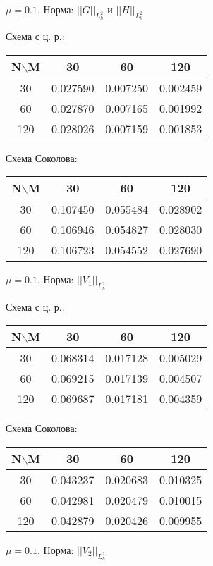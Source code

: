 \documentclass[specialist,subf,href,colorlinks=true,14pt,times,mtpro]{disser}
\begin{document}
$\mu = 0.1.$ Норма:  $||G||_{L^2_h}$ и $||H||_{L^2_h}$

Схема с ц. р.:

\begin{tabular}{|c|c|c|c|}
    \hline
    N$\backslash$M & 30 & 60 & 120 \\
    \hline
    30 & 0.027590 & 0.007250 & 0.002459 \\
    \hline
    60 & 0.027870 & 0.007165 & 0.001992 \\
    \hline
    120 & 0.028026 & 0.007159 & 0.001853 \\
    \hline
\end{tabular}
\BlankLine
Схема Соколова:

\begin{tabular}{|c|c|c|c|}
    \hline
    N$\backslash$M & 30 & 60 & 120 \\
    \hline
    30 & 0.107450 & 0.055484 & 0.028902 \\
    \hline
    60 & 0.106946 & 0.054827 & 0.028030 \\
    \hline
    120 & 0.106723 & 0.054552 & 0.027690 \\
    \hline
\end{tabular}
\BlankLine
\BlankLine
\BlankLine
$\mu = 0.1.$ Норма:  $||V_1||_{L^2_h}$

Схема с ц. р.:

\begin{tabular}{|c|c|c|c|}
    \hline
    N$\backslash$M & 30 & 60 & 120 \\
    \hline
    30 & 0.068314 & 0.017128 & 0.005029 \\
    \hline
    60 & 0.069215 & 0.017139 & 0.004507 \\
    \hline
    120 & 0.069687 & 0.017181 & 0.004359 \\
    \hline
\end{tabular}
\BlankLine
Схема Соколова:

\begin{tabular}{|c|c|c|c|}
    \hline
    N$\backslash$M & 30 & 60 & 120 \\
    \hline
    30 & 0.043237 & 0.020683 & 0.010325 \\
    \hline
    60 & 0.042981 & 0.020479 & 0.010015 \\
    \hline
    120 & 0.042879 & 0.020426 & 0.009955 \\
    \hline
\end{tabular}
\BlankLine
\BlankLine
\BlankLine

$\mu = 0.1.$ Норма:  $||V_2||_{L^2_h}$
\end{document}

